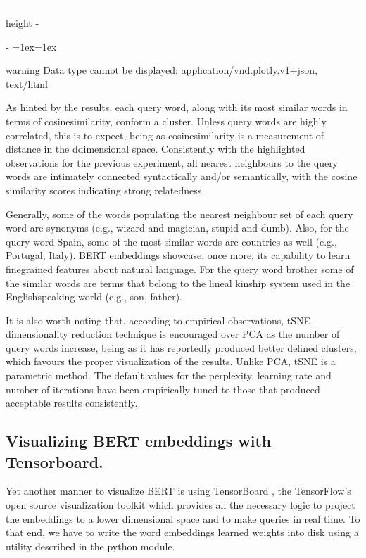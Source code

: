 \documentclass[letterpaper,10pt,english]{sphinxmanual}
\makeatletter
\newenvironment{nbsphinxfancyoutput}{%
    \let\sphinxincludegraphics\nbsphinxincludegraphics
    \nbsphinx@image@maxheight\textheight
    \advance\nbsphinx@image@maxheight -2\fboxsep   %
    \advance\nbsphinx@image@maxheight -2\fboxrule  %
    \advance\nbsphinx@image@maxheight -\baselineskip
\def\nbsphinxfcolorbox{\spx@fcolorbox{nbsphinx-code-border}{white}}%
\def\FrameCommand{\nbsphinxfcolorbox\nbsphinxfancyaddprompt\@empty}%
\def\FirstFrameCommand{\nbsphinxfcolorbox\nbsphinxfancyaddprompt\sphinxVerbatim@Continues}%
\def\MidFrameCommand{\nbsphinxfcolorbox\sphinxVerbatim@Continued\sphinxVerbatim@Continues}%
\def\LastFrameCommand{\nbsphinxfcolorbox\sphinxVerbatim@Continued\@empty}%
\MakeFramed{\advance\hsize-\width\@totalleftmargin\z@\linewidth\hsize\@setminipage}%
\lineskip=1ex\lineskiplimit=1ex\raggedright%
}{\par\unskip\@minipagefalse\endMakeFramed}
\def\nbsphinxfancyaddprompt{\ifvoid\nbsphinxpromptbox\else
    \kern\fboxrule\kern\fboxsep
    \copy\nbsphinxpromptbox
    \kern-\ht\nbsphinxpromptbox\kern-\dp\nbsphinxpromptbox
    \kern-\fboxsep\kern-\fboxrule\nointerlineskip
    \fi}
\newlength\nbsphinxcodecellspacing
\newcommand*{\nbsphinxincludegraphics}[2][]{%
    \gdef\spx@includegraphics@options{#1}%
    \setbox\spx@image@box\hbox{\texttt{[image: \#2]}}%
    \in@false
    \ifdim \wd\spx@image@box>\linewidth
      \g@addto@macro\spx@includegraphics@options{,width=\linewidth}%
      \in@true
    \fi
    \ifdim \ht\spx@image@box>\nbsphinx@image@maxheight
      \g@addto@macro\spx@includegraphics@options{,height=\nbsphinx@image@maxheight}%
      \in@true
    \fi
    \ifin@
      \g@addto@macro\spx@includegraphics@options{,keepaspectratio}%
    \fi
    \setbox\spx@image@box\box\voidb@x %
    \expandafter\includegraphics\expandafter[\spx@includegraphics@options]{#2}%
}%
\makeatother
\begin{document}
\hrule height -\fboxrule\relax
\vspace{\nbsphinxcodecellspacing}

\makeatletter\setbox\nbsphinxpromptbox\box\voidb@x\makeatother

\begin{nbsphinxfancyoutput}

\begin{sphinxadmonition}{warning}{}\unskip
Data type cannot be displayed: application/vnd.plotly.v1+json, text/html
\end{sphinxadmonition}

\end{nbsphinxfancyoutput}

As hinted by the results, each query word, along with its most similar words in terms of cosine\sphinxhyphen{}similarity, conform a cluster. Unless query words are highly correlated, this is to expect, being as cosine\sphinxhyphen{}similarity is a measurement of distance in the d\sphinxhyphen{}dimensional space. Consistently with the highlighted observations for the previous experiment, all nearest neighbours to the query words are intimately connected syntactically and/or semantically, with the cosine similarity scores indicating
strong relatedness.

Generally, some of the words populating the nearest neighbour set of each query word are synonyms (e.g., wizard and magician, stupid and dumb). Also, for the query word Spain, some of the most similar words are countries as well (e.g., Portugal, Italy). BERT embeddings showcase, once more, its capability to learn fine\sphinxhyphen{}grained features about natural language. For the query word brother some of the similar words are terms that belong to the lineal kinship system used in the English\sphinxhyphen{}speaking world
(e.g., son, father).

It is also worth noting that, according to empirical observations, t\sphinxhyphen{}SNE dimensionality reduction technique is encouraged over PCA as the number of query words increase, being as it has reportedly produced better defined clusters, which favours the proper visualization of the results. Unlike PCA, t\sphinxhyphen{}SNE is a parametric method. The default values for the perplexity, learning rate and number of iterations have been empirically tuned to those that produced acceptable results consistently.


\subsection{Visualizing BERT embeddings with Tensorboard.}
\label{\detokenize{Visualization of BERT embeddings:Visualizing-BERT-embeddings-with-Tensorboard.}}
Yet another manner to visualize BERT is using TensorBoard , the TensorFlow’s open source visualization toolkit which provides all the necessary logic to project the embeddings to a lower dimensional space and to make queries in real time. To that end, we have to write the word embeddings learned weights into disk using a utility described in the  python module.
\end{document}
